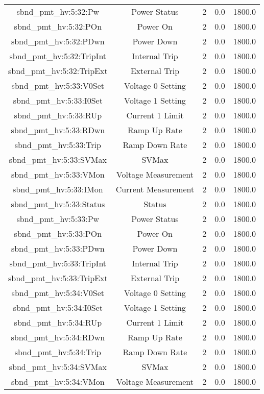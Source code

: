 \begin{center}
\begin{longtable}{c | c c c c }
sbnd\_pmt\_hv:5:32:Pw & Power Status & 2 & 0.0 & 1800.0\\ 
sbnd\_pmt\_hv:5:32:POn & Power On & 2 & 0.0 & 1800.0\\ 
sbnd\_pmt\_hv:5:32:PDwn & Power Down & 2 & 0.0 & 1800.0\\ 
sbnd\_pmt\_hv:5:32:TripInt & Internal Trip & 2 & 0.0 & 1800.0\\ 
sbnd\_pmt\_hv:5:32:TripExt & External Trip & 2 & 0.0 & 1800.0\\ 
sbnd\_pmt\_hv:5:33:V0Set & Voltage 0 Setting & 2 & 0.0 & 1800.0\\ 
sbnd\_pmt\_hv:5:33:I0Set & Voltage 1 Setting & 2 & 0.0 & 1800.0\\ 
sbnd\_pmt\_hv:5:33:RUp & Current 1 Limit & 2 & 0.0 & 1800.0\\ 
sbnd\_pmt\_hv:5:33:RDwn & Ramp Up Rate & 2 & 0.0 & 1800.0\\ 
sbnd\_pmt\_hv:5:33:Trip & Ramp Down Rate & 2 & 0.0 & 1800.0\\ 
sbnd\_pmt\_hv:5:33:SVMax & SVMax & 2 & 0.0 & 1800.0\\ 
sbnd\_pmt\_hv:5:33:VMon & Voltage Measurement & 2 & 0.0 & 1800.0\\ 
sbnd\_pmt\_hv:5:33:IMon & Current Measurement & 2 & 0.0 & 1800.0\\ 
sbnd\_pmt\_hv:5:33:Status & Status & 2 & 0.0 & 1800.0\\ 
sbnd\_pmt\_hv:5:33:Pw & Power Status & 2 & 0.0 & 1800.0\\ 
sbnd\_pmt\_hv:5:33:POn & Power On & 2 & 0.0 & 1800.0\\ 
sbnd\_pmt\_hv:5:33:PDwn & Power Down & 2 & 0.0 & 1800.0\\ 
sbnd\_pmt\_hv:5:33:TripInt & Internal Trip & 2 & 0.0 & 1800.0\\ 
sbnd\_pmt\_hv:5:33:TripExt & External Trip & 2 & 0.0 & 1800.0\\ 
sbnd\_pmt\_hv:5:34:V0Set & Voltage 0 Setting & 2 & 0.0 & 1800.0\\ 
sbnd\_pmt\_hv:5:34:I0Set & Voltage 1 Setting & 2 & 0.0 & 1800.0\\ 
sbnd\_pmt\_hv:5:34:RUp & Current 1 Limit & 2 & 0.0 & 1800.0\\ 
sbnd\_pmt\_hv:5:34:RDwn & Ramp Up Rate & 2 & 0.0 & 1800.0\\ 
sbnd\_pmt\_hv:5:34:Trip & Ramp Down Rate & 2 & 0.0 & 1800.0\\ 
sbnd\_pmt\_hv:5:34:SVMax & SVMax & 2 & 0.0 & 1800.0\\ 
sbnd\_pmt\_hv:5:34:VMon & Voltage Measurement & 2 & 0.0 & 1800.0\\ 

\end{longtable}
\end{center}
